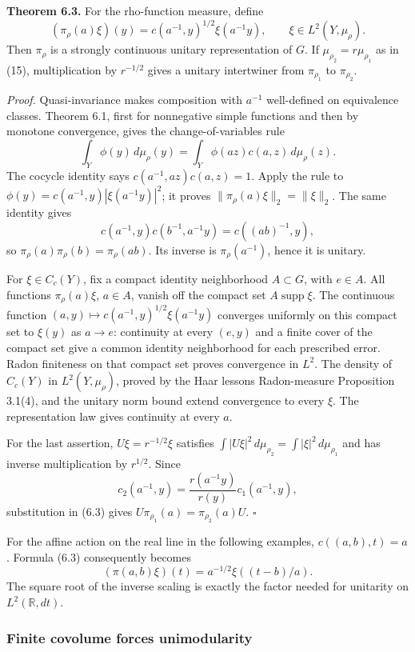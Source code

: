 \documentclass[
  english,
  11pt,
  a4paper,
]{article}
\begin{document}
\textbf{Theorem 6.3.} For the rho-function measure, define
\[(\pi_\rho(a)\xi)(y)=c(a^{-1},y)^{1/2}\xi(a^{-1}y),
\qquad \xi\in L^2(Y,\mu_\rho).
\tag{6.3}\] Then \(\pi_\rho\) is a strongly continuous unitary
representation of \(G\). If \(\mu_{\rho_2}=r\mu_{\rho_1}\) as in (15),
multiplication by \(r^{-1/2}\) gives a unitary intertwiner from
\(\pi_{\rho_1}\) to \(\pi_{\rho_2}\).

\emph{Proof.} Quasi-invariance makes composition with \(a^{-1}\)
well-defined on equivalence classes. Theorem 6.1, first for nonnegative
simple functions and then by monotone convergence, gives the
change-of-variables rule \[\int_Y\phi(y)\,d\mu_\rho(y)
=\int_Y\phi(az)c(a,z)\,d\mu_\rho(z).\] The cocycle identity says
\(c(a^{-1},az)c(a,z)=1\). Apply the rule to
\(\phi(y)=c(a^{-1},y)|\xi(a^{-1}y)|^2\); it proves
\(\|\pi_\rho(a)\xi\|_2=\|\xi\|_2\). The same identity gives
\[c(a^{-1},y)c(b^{-1},a^{-1}y)=c((ab)^{-1},y),\] so
\(\pi_\rho(a)\pi_\rho(b)=\pi_\rho(ab)\). Its inverse is
\(\pi_\rho(a^{-1})\), hence it is unitary.

For \(\xi\in C_c(Y)\), fix a compact identity neighborhood
\(A\subset G\), with \(e\in A\). All functions \(\pi_\rho(a)\xi\),
\(a\in A\), vanish off the compact set \(A\operatorname{supp}\xi\). The
continuous function \((a,y)\mapsto c(a^{-1},y)^{1/2}\xi(a^{-1}y)\)
converges uniformly on this compact set to \(\xi(y)\) as \(a\to e\):
continuity at every \((e,y)\) and a finite cover of the compact set give
a common identity neighborhood for each prescribed error. Radon
finiteness on that compact set proves convergence in \(L^2\). The
density of \(C_c(Y)\) in \(L^2(Y,\mu_\rho)\), proved by the Haar
lesson\textquotesingle s Radon-measure Proposition 3.1(4), and the
unitary norm bound extend convergence to every \(\xi\). The
representation law gives continuity at every \(a\).

For the last assertion, \(U\xi=r^{-1/2}\xi\) satisfies
\(\int|U\xi|^2\,d\mu_{\rho_2}=\int|\xi|^2\,d\mu_{\rho_1}\) and has
inverse multiplication by \(r^{1/2}\). Since
\[c_2(a^{-1},y)=\frac{r(a^{-1}y)}{r(y)}c_1(a^{-1},y),\] substitution in
(6.3) gives \(U\pi_{\rho_1}(a)=\pi_{\rho_2}(a)U\). \(\square\)

For the affine action on the real line in the following examples,
\(c((a,b),t)=a\). Formula (6.3) consequently becomes
\[(\pi(a,b)\xi)(t)=a^{-1/2}\xi((t-b)/a).\] The square root of the
inverse scaling is exactly the factor needed for unitarity on
\(L^2(\mathbb R,dt)\).

\subsubsection{Finite covolume forces
unimodularity}\label{quotient-measures-and-weils-integration-formula--finite-covolume-unimodularity}
\end{document}
